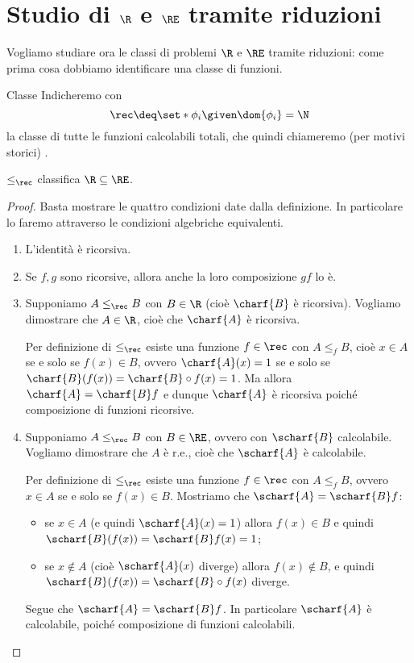 \section{Studio di $\R$ e $\RE$ tramite riduzioni}

Vogliamo studiare ora le classi di problemi $\R$ e $\RE$ tramite riduzioni: come prima cosa dobbiamo identificare una classe di funzioni. 

\begin{definition}
    {Classe \rec}{}
    Indicheremo con \[
        \rec \deq \set*{\phi_i \given \dom{\phi_i} = \N}
    \] la classe di tutte le funzioni calcolabili totali, che quindi chiameremo (per motivi storici) .
\end{definition}

\begin{proposition}
    {}{}
    $\leq_\rec$ classifica $\R \subseteq \RE$. 
\end{proposition}
\begin{proof}
    Basta mostrare le quattro condizioni date dalla definizione. In particolare lo faremo attraverso le condizioni algebriche equivalenti.
    \begin{enumerate}
        \item L'identità è ricorsiva.
        \item Se $f, g$ sono ricorsive, allora anche la loro composizione $gf$ lo è.
        \item Supponiamo $A \leq_\rec B$ con $B \in \R$ (cioè $\charf{B}$ è ricorsiva). Vogliamo dimostrare che $A \in \R$, cioè che $\charf{A}$ è ricorsiva.
        
        Per definizione di $\leq_\rec$ esiste una funzione $f \in \rec$ con $A \leq_f B$, cioè $x \in A$ se e solo se $f(x) \in B$, ovvero $\charf{A}(x) = 1$ se e solo se $\charf{B}(f(x)) = \charf{B} \circ f(x) = 1$. Ma allora $\charf{A} = \charf{B}f$ e dunque $\charf{A}$ è ricorsiva poiché composizione di funzioni ricorsive.
        \item Supponiamo $A \leq_\rec B$ con $B \in \RE$, ovvero con $\scharf{B}$ calcolabile. Vogliamo dimostrare che $A$ è r.e., cioè che $\scharf{A}$ è calcolabile.
        
        Per definizione di $\leq_\rec$ esiste una funzione $f \in \rec$ con $A \leq_f B$, ovvero $x \in A$ se e solo se $f(x) \in B$.
        Mostriamo che $\scharf{A} = \scharf{B}f$:
        \begin{itemize}
            \item se $x \in A$ (e quindi $\scharf{A}(x) = 1$) allora $f(x) \in B$ e quindi $\scharf{B}(f(x)) = \scharf{B}f(x) = 1$;
            \item se $x \notin A$ (cioè $\scharf{A}(x)$ diverge) allora $f(x) \notin B$, e quindi $\scharf{B}(f(x)) = \scharf{B} \circ f(x)$ diverge.
        \end{itemize}
        
        Segue che $\scharf{A} = \scharf{B}f$. In particolare $\scharf{A}$ è calcolabile, poiché composizione di funzioni calcolabili.  \qedhere
    \end{enumerate}
\end{proof}

